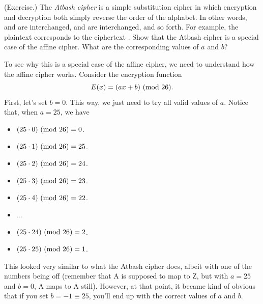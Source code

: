 \documentclass[letterpaper]{article}
\begin{document}
\begin{mdframed}
    (Exercise.) The \emph{Atbash cipher} is a simple substitution cipher in which encryption and decryption both simply reverse the order of the alphabet. In other words,  and  are interchanged,  and  are interchanged, and so forth. For example, the plaintext  corresponds to the ciphertext . Show that the Atbash cipher is a special case of the affine cipher. What are the corresponding values of $a$ and $b$? 
    
    \begin{mdframed}
        To see why this is a special case of the affine cipher, we need to understand how the affine cipher works. Consider the encryption function \[E(x) = (ax + b) \ (\mathrm{mod}\ 26).\] First, let's set $b = 0$. This way, we just need to try all valid values of $a$. Notice that, when $a = 25$, we have 
        \begin{itemize}
            \item $(25 \cdot 0) \ (\mathrm{mod}\ 26) = 0$.
            \item $(25 \cdot 1) \ (\mathrm{mod}\ 26) = 25$.
            \item $(25 \cdot 2) \ (\mathrm{mod}\ 26) = 24$.
            \item $(25 \cdot 3) \ (\mathrm{mod}\ 26) = 23$.
            \item $(25 \cdot 4) \ (\mathrm{mod}\ 26) = 22$.
            \item $\hdots$
            \item $(25 \cdot 24) \ (\mathrm{mod}\ 26) = 2$.
            \item $(25 \cdot 25) \ (\mathrm{mod}\ 26) = 1$.
        \end{itemize}
        This looked very similar to what the Atbash cipher does, albeit with one of the numbers being off (remember that A is supposed to map to Z, but with $a = 25$ and $b = 0$, A maps to A still). However, at that point, it became kind of obvious that if you set $b = -1 \equiv 25$, you'll end up with the correct values of $a$ and $b$.
    \end{mdframed}
\end{mdframed}
\end{document}
